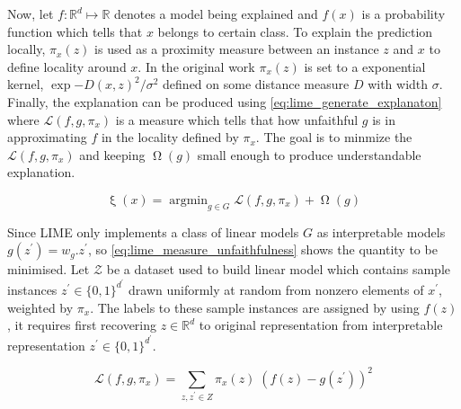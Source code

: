 \documentclass[english]{tktltiki2}
\theoremstyle{definition}
\theoremstyle{remark}
\newcommand{\onespace}{\;}
\DeclareMathOperator*{\argmin}{argmin}
\begin{document}
Now, let $f: \mathbb{R}^d \mapsto \mathbb{R}$ denotes a model being explained and $f(x)$ is a probability function which tells that $x$ belongs to certain class. To explain the prediction locally, $\pi_x(z)$ is used as a proximity measure between an instance $z$ and $x$ to define locality around $x$. In the original work \citep{ribeiro2016should} $\pi_x(z)$ is set to a exponential kernel, $\exp{-D(x,z)^2/\sigma^2}$ defined on some distance measure $D$ with width $\sigma$.
Finally, the explanation can be produced using \eqref{eq:lime_generate_explanaton} where $\mathcal{L}(f, g, \pi_x)$ is a measure which tells that how unfaithful $g$ is in approximating $f$ in the locality defined by $\pi_x$. The goal is to minmize the $\mathcal{L}(f, g, \pi_x)$ and keeping $\upOmega(g)$ small enough to produce understandable explanation.

\begin{equation}\label{eq:lime_generate_explanaton}
\mathsf{\upxi}(x) = \argmin_{g \in G} \mathcal{L}(f, g, \pi_x) + \upOmega(g)
\end{equation}

Since LIME \citep{ribeiro2016should} only implements a class of linear models $G$ as interpretable models $g(z^\prime)=w_g.z^\prime$, so \eqref{eq:lime_measure_unfaithfulness} shows the quantity to be minimised. Let $\mathcal{Z}$ be a dataset used to build linear model which contains sample instances $z^\prime \in \{0, 1\}^{d^\prime}$ drawn uniformly at random from nonzero elements of $x^\prime$, weighted by $\pi_x$. The labels to these sample instances are assigned by using $f(z)$, it requires first recovering $z \in \mathbb{R}^d$ to original representation from interpretable representation  $z^\prime \in \{0, 1\}^{d^\prime}$. 

\begin{equation}\label{eq:lime_measure_unfaithfulness}
\mathcal{L}(f, g, \pi_x) = \sum_{z, z^\prime \in Z} \pi_x(z)\onespace(f(z) - g(z^\prime))^2
\end{equation}

\end{document}
